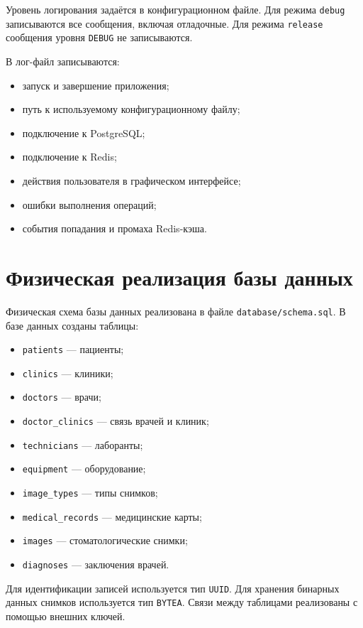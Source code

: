 Уровень логирования задаётся в конфигурационном файле. Для режима \texttt{debug} записываются все сообщения, включая отладочные. Для режима \texttt{release} сообщения уровня \texttt{DEBUG} не записываются.

В лог-файл записываются:

\begin{itemize}
	\item запуск и завершение приложения;
	\item путь к используемому конфигурационному файлу;
	\item подключение к PostgreSQL;
	\item подключение к Redis;
	\item действия пользователя в графическом интерфейсе;
	\item ошибки выполнения операций;
	\item события попадания и промаха Redis-кэша.
\end{itemize}

\section{Физическая реализация базы данных}

Физическая схема базы данных реализована в файле \texttt{database/schema.sql}. В базе данных созданы таблицы:

\begin{itemize}
	\item \texttt{patients} --- пациенты;
	\item \texttt{clinics} --- клиники;
	\item \texttt{doctors} --- врачи;
	\item \texttt{doctor\_clinics} --- связь врачей и клиник;
	\item \texttt{technicians} --- лаборанты;
	\item \texttt{equipment} --- оборудование;
	\item \texttt{image\_types} --- типы снимков;
	\item \texttt{medical\_records} --- медицинские карты;
	\item \texttt{images} --- стоматологические снимки;
	\item \texttt{diagnoses} --- заключения врачей.
\end{itemize}

Для идентификации записей используется тип \texttt{UUID}. Для хранения бинарных данных снимков используется тип \texttt{BYTEA}. Связи между таблицами реализованы с помощью внешних ключей.

